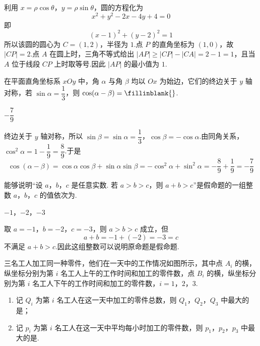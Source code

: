 \begin{solution}
利用 \(x=\rho\cos\theta\)，\(y=\rho\sin\theta\)，圆的方程化为
\[
x^2+y^2-2x-4y+4=0
\]
即
\[
(x-1)^2+(y-2)^2=1
\]
所以该圆的圆心为 \(C=(1,2)\)，半径为 \(1\).点 \(P\) 的直角坐标为 \((1,0)\)，故 \(|CP|=2\).点 \(A\) 在圆上时，三角不等式给出 \(|AP|\ge|CP|-|CA|=2-1=1\)，且当 \(A\) 位于线段 \(CP\) 上时取等号.因此 \(|AP|\) 的最小值为 \(1\).
\end{solution}

\begin{problem}
在平面直角坐标系 \(xOy\) 中，角 \(\alpha\) 与角 \(\beta\) 均以 \(Ox\) 为始边，它们的终边关于 \(y\) 轴对称，若 \(\sin\alpha=\dfrac13\)，则 \(\cos(\alpha-\beta)=\fillinblank{}\).
\end{problem}

\begin{answer}
\(-\dfrac{7}{9}\)
\end{answer}

\begin{solution}
终边关于 \(y\) 轴对称，所以 \(\sin\beta=\sin\alpha=\dfrac13\)，\(\cos\beta=-\cos\alpha\).由同角关系，\(\cos^2\alpha=1-\dfrac19=\dfrac89\).于是
\[
\cos(\alpha-\beta)=\cos\alpha\cos\beta+\sin\alpha\sin\beta=-\cos^2\alpha+\sin^2\alpha=-\frac89+\frac19=-\frac79
\]
\end{solution}

\begin{problem}
能够说明“设 \(a\)，\(b\)，\(c\) 是任意实数. 若 \(a>b>c\)，则 \(a+b>c\)”是假命题的一组整数 \(a\)，\(b\)，\(c\) 的值依次为\fillinblank{}.
\end{problem}

\begin{answer}
\(-1\)，\(-2\)，\(-3\)
\end{answer}

\begin{solution}
取 \(a=-1\)，\(b=-2\)，\(c=-3\)，则 \(a>b>c\) 成立，但
\[
a+b=-1+(-2)=-3=c
\]
不满足 \(a+b>c\).因此这组整数可以说明原命题是假命题.
\end{solution}

\begin{problem}
三名工人加工同一种零件，他们在一天中的工作情况如图所示，其中点 \(A_i\) 的横，纵坐标分别为第 \(i\) 名工人上午的工作时间和加工的零件数，点 \(B_i\) 的横，纵坐标分别为第 \(i\) 名工人下午的工作时间和加工的零件数，\(i=1\)，\(2\)，\(3\).

\begin{enumerate}
\item 记 \(Q_i\) 为第 \(i\) 名工人在这一天中加工的零件总数，则 \(Q_1\)，\(Q_2\)，\(Q_3\) 中最大的是\fillinblank{}；
\item 记 \(p_i\) 为第 \(i\) 名工人在这一天中平均每小时加工的零件数，则 \(p_1\)，\(p_2\)，\(p_3\) 中最大的是\fillinblank{}.
\end{enumerate}

\end{problem}

